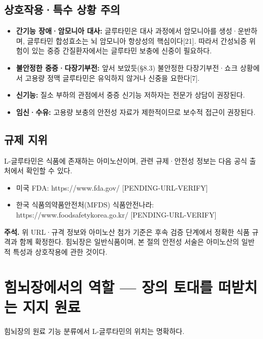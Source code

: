 \documentclass[11pt,oneside]{book}
\newenvironment{authnote}
  {\par\smallskip\begingroup\leftskip=7mm\rightskip=5mm\small\color{muted}\noindent\ignorespaces}
  {\par\endgroup\smallskip}
\begin{document}
\subsection{상호작용·특수 상황 주의}
\begin{itemize}[leftmargin=6mm,itemsep=1pt,topsep=2pt]
  \item \textbf{간기능 장애·암모니아 대사:} 글루타민은 대사 과정에서 암모니아를 생성·운반하며, 글루타민 합성효소는 뇌 암모니아 항상성의 핵심이다[21]. 따라서 간성뇌증 위험이 있는 중증 간질환자에서는 글루타민 보충에 신중이 필요하다.
  \item \textbf{불안정한 중증·다장기부전:} 앞서 보았듯(§8.3) 불안정한 다장기부전·쇼크 상황에서 고용량 정맥 글루타민은 유익하지 않거나 신중을 요한다[7].
  \item \textbf{신기능:} 질소 부하의 관점에서 중증 신기능 저하자는 전문가 상담이 권장된다.
  \item \textbf{임신·수유:} 고용량 보충의 안전성 자료가 제한적이므로 보수적 접근이 권장된다.
\end{itemize}
\subsection{규제 지위}
L-글루타민은 식품에 존재하는 아미노산이며, 관련 규제·안전성 정보는 다음 공식 출처에서 확인할 수 있다.

\begin{itemize}[leftmargin=6mm,itemsep=1pt,topsep=2pt]
  \item 미국 FDA: https://www.fda.gov/ [PENDING-URL-VERIFY]
  \item 한국 식품의약품안전처(MFDS) 식품안전나라: https://www.foodsafetykorea.go.kr/ [PENDING-URL-VERIFY]
\end{itemize}
\begin{authnote}\textbf{주석.} 위 URL·규격 정보와 아미노산 첨가 기준은 후속 검증 단계에서 정확한 식품 규격과 함께 확정한다. 힘뇌장은 일반식품이며, 본 절의 안전성 서술은 아미노산의 일반적 특성과 상호작용에 관한 것이다.\end{authnote}
\section{힘뇌장에서의 역할 — 장의 토대를 떠받치는 지지 원료}
힘뇌장의 원료 기능 분류에서 L-글루타민의 위치는 명확하다.

\vspace{2pt}\vspace{3pt}
\end{document}
